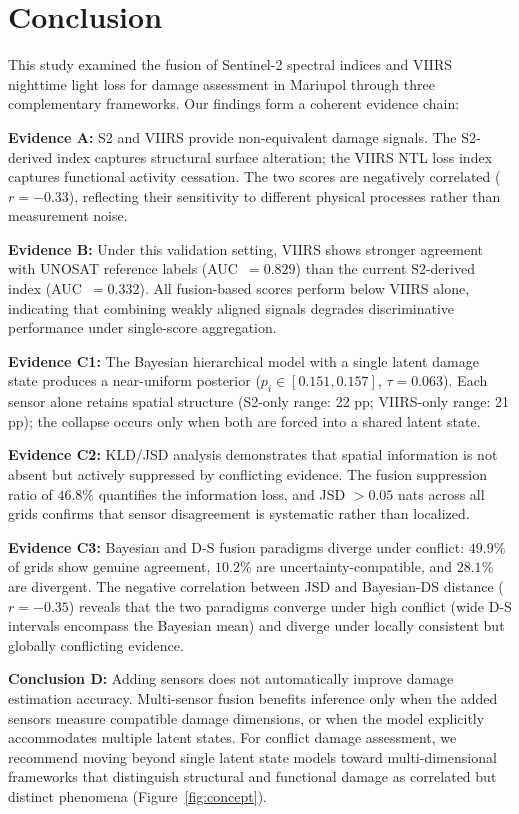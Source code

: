 \documentclass[wcp]{jmlr}
\begin{document}
\section{Conclusion}\label{sec:conclusion}

This study examined the fusion of Sentinel-2 spectral indices and VIIRS
nighttime light loss for damage assessment in Mariupol through three
complementary frameworks. Our findings form a coherent evidence chain:

\textbf{Evidence A:} S2 and VIIRS provide non-equivalent damage signals.
The S2-derived index captures structural surface alteration; the VIIRS NTL
loss index captures functional activity cessation. The two scores are
negatively correlated ($r = -0.33$), reflecting their sensitivity to
different physical processes rather than measurement noise.

\textbf{Evidence B:} Under this validation setting, VIIRS shows stronger
agreement with UNOSAT reference labels (AUC~$=0.829$) than the current
S2-derived index (AUC~$=0.332$). All fusion-based scores perform below
VIIRS alone, indicating that combining weakly aligned signals degrades
discriminative performance under single-score aggregation.

\textbf{Evidence C1:} The Bayesian hierarchical model with a single latent
damage state produces a near-uniform posterior ($p_i \in [0.151, 0.157]$,
$\tau=0.063$). Each sensor alone retains spatial structure (S2-only range:
22 pp; VIIRS-only range: 21 pp); the collapse occurs only when both are
forced into a shared latent state.

\textbf{Evidence C2:} KLD/JSD analysis demonstrates that spatial information
is not absent but actively suppressed by conflicting evidence. The fusion
suppression ratio of $46.8\%$ quantifies the information loss, and JSD
$>0.05$ nats across all grids confirms that sensor disagreement is
systematic rather than localized.

\textbf{Evidence C3:} Bayesian and D-S fusion paradigms diverge under
conflict: $49.9\%$ of grids show genuine agreement, $10.2\%$ are
uncertainty-compatible, and $28.1\%$ are divergent. The negative
correlation between JSD and Bayesian-DS distance ($r = -0.35$) reveals that
the two paradigms converge under high conflict (wide D-S intervals encompass
the Bayesian mean) and diverge under locally consistent but globally
conflicting evidence.

\textbf{Conclusion D:} Adding sensors does not automatically improve damage
estimation accuracy. Multi-sensor fusion benefits inference only when the
added sensors measure compatible damage dimensions, or when the model
explicitly accommodates multiple latent states. For conflict damage
assessment, we recommend moving beyond single latent state models toward
multi-dimensional frameworks that distinguish structural and functional
damage as correlated but distinct phenomena (Figure~\ref{fig:concept}).
\end{document}
